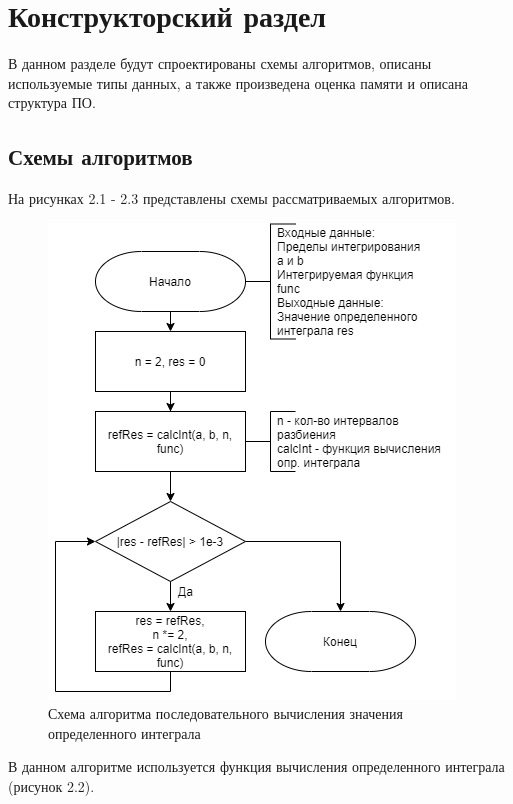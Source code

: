 \chapter{Конструкторский раздел}

В данном разделе будут спроектированы схемы алгоритмов, описаны используемые типы данных, а также произведена оценка памяти и описана структура ПО.

\section{Схемы алгоритмов}

На рисунках 2.1 - 2.3 представлены схемы рассматриваемых алгоритмов.

\begin{figure}[h!]
	\begin{center}
		\includegraphics[scale=0.7]{assets/refineIntegral.png}
	\end{center}
	\caption{Схема алгоритма последовательного вычисления значения определенного интеграла}
\end{figure}

В данном алгоритме используется функция вычисления определенного интеграла (рисунок 2.2).

